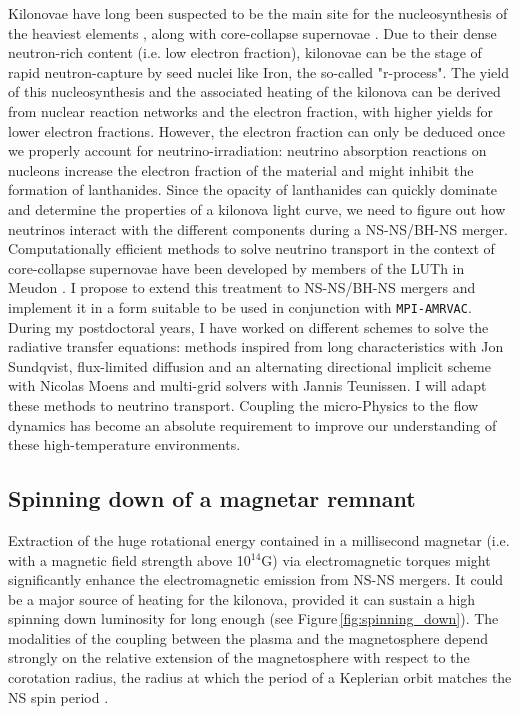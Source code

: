 \documentclass[11pt,onecolumn]{article}
\makeatletter
\newcommand*{\ns}{NS\@\xspace}
\newcommand*{\bh}{BH\@\xspace}
\newcommand*{\eg}{e.g.\@\xspace}
\newcommand*{\ie}{i.e.\@\xspace}
\makeatother
\begin{document}
Kilonovae have long been suspected to be the main site for the nucleosynthesis of the heaviest elements \citep{Lattimer1974}, along with core-collapse supernovae \citep{MacFadyen1999}. Due to their dense neutron-rich content (\ie low electron fraction), kilonovae can be the stage of rapid neutron-capture by seed nuclei like Iron, the so-called "r-process". The yield of this nucleosynthesis and the associated heating of the kilonova can be derived from nuclear reaction networks \citep{Metzger2010} and the electron fraction, with higher yields for lower electron fractions. However, the electron fraction can only be deduced once we properly account for neutrino-irradiation: neutrino absorption reactions on nucleons increase the electron fraction of the material and might inhibit the formation of lanthanides. Since the opacity of lanthanides can quickly dominate and determine the properties of a kilonova light curve, we need to figure out how neutrinos interact with the different components during a \ns-\ns/\bh-\ns merger.\\

Computationally efficient methods to solve neutrino transport in the context of core-collapse supernovae have been developed by members of the LUTh in Meudon \citep{Peres2011,Peres2013}. I propose to extend this treatment to \ns-\ns/\bh-\ns mergers and implement it in a form suitable to be used in conjunction with \texttt{MPI-AMRVAC}. During my postdoctoral years, I have worked on different schemes to solve the radiative transfer equations: methods inspired from long characteristics with Jon Sundqvist, flux-limited diffusion and an alternating directional implicit scheme with Nicolas Moens and multi-grid solvers with Jannis Teunissen. I will adapt these methods to neutrino transport. Coupling the micro-Physics to the flow dynamics has become an absolute requirement to improve our understanding of these high-temperature environments. 

\subsection{Spinning down of a magnetar remnant}
\label{sec:spin}

Extraction of the huge rotational energy contained in a millisecond magnetar (\ie with a magnetic field strength above 10$^{14}$G) via electromagnetic torques might significantly enhance the electromagnetic emission from \ns-\ns mergers. It could be a major source of heating for the kilonova, provided it can sustain a high spinning down luminosity for long enough (see Figure\,\ref{fig:spinning_down}). The modalities of the coupling between the plasma and the magnetosphere depend strongly on the relative extension of the magnetosphere with respect to the corotation radius, the radius at which the period of a Keplerian orbit matches the \ns spin period \citep[see \eg the propeller effect described in][]{Bozzo2008}. \\
\end{document}
